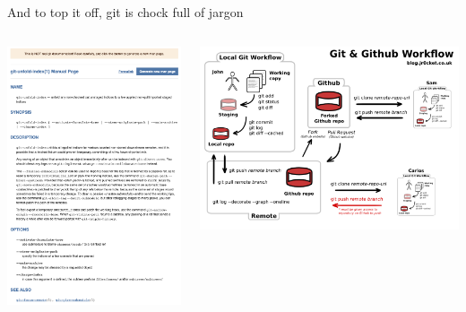 \documentclass[ignorenonframetext, 10pt, aspectratio=169]{beamer}
\begin{document}
\begin{frame}{And to top it off, git is chock full of jargon}
\begin{columns}[T]
\begin{column}{0.4\textwidth}
\begin{overprint}
\includegraphics[width=\linewidth]{spoof-1.png}
\end{overprint}
\end{column}
\begin{column}{0.5\textwidth}
\includegraphics[width=\linewidth]{git-and-github-workflow.png}
\end{column}
\end{columns}

\end{frame}
\end{document}
